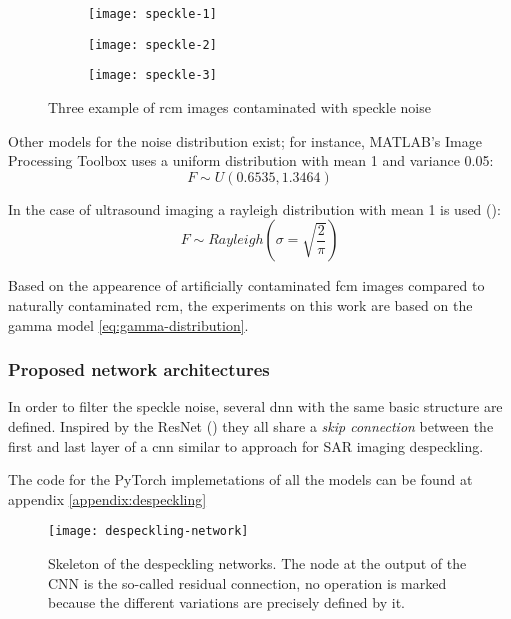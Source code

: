 \documentclass[../main.tex]{subfiles}
\begin{document}
\begin{figure}[h]
\centering
\begin{subfigure}{.3\textwidth}
  \centering
  \texttt{[image: speckle-1]}
\end{subfigure}%
\begin{subfigure}{.3\textwidth}
  \centering
  \texttt{[image: speckle-2]}
\end{subfigure}%
\begin{subfigure}{.3\textwidth}
  \centering
  \texttt{[image: speckle-3]}
\end{subfigure}
\caption{Three example of \gls{rcm} images contaminated with speckle noise}
\label{fig:speckle}
\end{figure}

Other models for the noise distribution exist; for instance, MATLAB's
Image Processing Toolbox uses a uniform distribution with mean 1 and
variance 0.05:
\begin{equation}
F \sim U(0.6535,1.3464)
\end{equation}

In the case of ultrasound imaging a rayleigh distribution with mean 1 is used
(\cite{RayleighSpeckle}):
\begin{equation}
F \sim Rayleigh(\sigma=\sqrt{\frac{2}{\pi}})
\end{equation}

Based on the appearence of artificially contaminated \gls{fcm} images compared to
naturally contaminated \gls{rcm}, the experiments on this work are based on the
gamma model \eqref{eq:gamma-distribution}.

\subsubsection{Proposed network architectures}
In order to filter the speckle noise, several \gls{dnn} with the same basic
structure are defined. Inspired by the ResNet (\cite{he2015deep}) they all share a
\emph{skip connection} between the first and last layer of a \gls{cnn} similar to
\cite{Wang2018} approach for SAR imaging despeckling.

The code for the PyTorch implemetations of all the models can be found at
appendix \ref{appendix:despeckling}

\begin{figure}[H]
\centering
\texttt{[image: despeckling-network]}
\caption{Skeleton of the despeckling networks. The node at the output of the
CNN is the so-called residual connection, no operation is marked because
the different variations are precisely defined by it.}
\label{fig:despeckling-network}
\end{figure}
\end{document}
